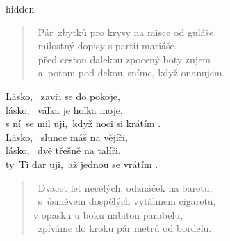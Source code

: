 \begin{song}{}
  \begin{optional}{hidden}
      
\end{optional}
\begin{verse}
   ~Pár~zbytků pro krysy na misce od guláše, \\
   ~milostný dopisy s partií mariáše, \\
   ~před cestou dalekou zpocený boty zujem \\
   ~a~potom pod dekou~sníme, když onanujem.
\end{verse}
\begin{refren}
   Lásko, ~zavři se do pokoje,  \\
   lásko, ~válka je holka moje, \\
   s ní~se mil uji,~když noci si krátím .   \\
   Lásko, ~slunce máš na vějíři,  \\
   lásko, ~dvě třešně na talíři, \\
   ty~Ti dar uji,~až jednou se vrátím .  
\end{refren}
\begin{verse}
   ~Dvacet let necelých, odznáček na baretu, \\
   ~s~úsměvem dospělých vytáhnem cigaretu, \\
   v opasku u boku nabitou parabelu, \\
   ~zpíváme do kroku pár metrů od bordelu.
\end{verse}


\end{song}
